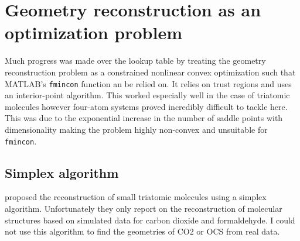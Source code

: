 \chapter{Geometry reconstruction as an optimization problem}\label{ch:optimization}

Much progress was made over the lookup table by treating the geometry reconstruction problem as a constrained nonlinear convex optimization such that MATLAB's \texttt{fmincon} function an be relied on. It relies on trust regions and uses an interior-point algorithm. This worked especially well in the case of triatomic molecules however four-atom systems proved incredibly difficult to tackle here. This was due to the exponential increase in the number of saddle points with dimensionality  making the problem highly non-convex and unsuitable for \texttt{fmincon}.

\section{Simplex algorithm}

\citet{Brichta09} proposed the reconstruction of small triatomic molecules using a simplex algorithm. Unfortunately they only report on the reconstruction of molecular structures based on simulated data for carbon dioxide and formaldehyde. I could not use this algorithm to find the geometries of CO2 or OCS from real data.